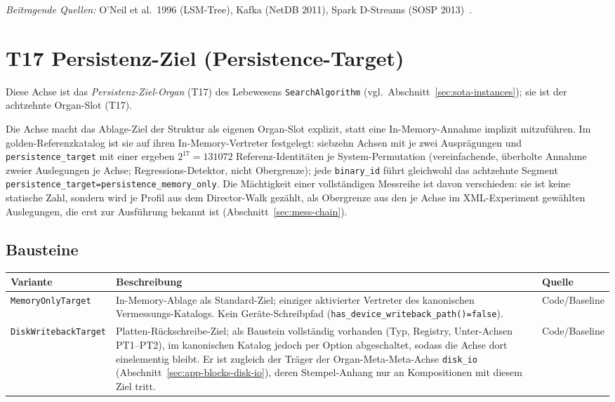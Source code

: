 \emph{Beitragende Quellen:} O'Neil et al.\ 1996 (LSM-Tree), Kafka (Net\allowbreak{}DB 2011), Spark D-Streams (SOSP 2013)~\cite{oneil1996lsm,kreps2011kafka,zaharia2013dstreams}.

\section{T17 Persistenz-Ziel (Persistence-Target)}

Diese Achse ist das \emph{Persistenz-Ziel-Organ} (T17) des Lebewesens \texttt{SearchAlgorithm} (vgl.\ Abschnitt~\ref{sec:sota-instances}); sie ist der achtzehnte Organ-Slot (T17).

Die Achse macht das Ablage-Ziel der Struktur als eigenen Organ-Slot explizit, statt eine In-Memory-Annahme implizit mitzuführen. Im golden-Referenzkatalog ist sie auf ihren In-Memory-Vertreter festgelegt: siebzehn Achsen mit je zwei Ausprägungen und \texttt{persistence\_\allowbreak{}target} mit einer ergeben $2^{17} = 131072$ Referenz-Identitäten je System-Permutation (vereinfachende, überholte Annahme zweier Auslegungen je Achse; Regressions-Detektor, nicht Obergrenze); jede \texttt{binary\_\allowbreak{}id} führt gleichwohl das achtzehnte Segment \texttt{persistence\_\allowbreak{}target=\allowbreak{}persistence\_\allowbreak{}memory\_\allowbreak{}only}. Die Mächtigkeit einer vollständigen Messreihe ist davon verschieden: sie ist keine statische Zahl, sondern wird je Profil aus dem Director-Walk gezählt, als Obergrenze aus den je Achse im XML-Experiment gewählten Auslegungen, die erst zur Ausführung bekannt ist (Abschnitt~\ref{sec:mess-chain}).

\subsection*{Bausteine}
\begin{scriptsize}
\begin{longtable}{@{}>{\raggedright\arraybackslash}p{3.0cm} >{\raggedright\arraybackslash}p{8.5cm} >{\raggedright\arraybackslash}p{2.0cm}@{}}
\toprule
Variante & Beschreibung & Quelle \\
\midrule
\endhead%
\texttt{Memory\allowbreak{}Only\allowbreak{}Target} & In-Memory-Ablage als Standard-Ziel; einziger aktivierter Vertreter des kanonischen Vermessungs-Katalogs. Kein Geräte-Schreibpfad (\texttt{has\_\allowbreak{}device\_\allowbreak{}writeback\_\allowbreak{}path()=false}). & Code/\allowbreak{}Baseline \\
\texttt{Disk\allowbreak{}Writeback\allowbreak{}Target} & Platten-Rückschreibe-Ziel; als Baustein vollständig vorhanden (Typ, Registry, Unter-Achsen PT1--PT2), im kanonischen Katalog jedoch per Option abgeschaltet, sodass die Achse dort einelementig bleibt. Er ist zugleich der Träger der Organ-Meta-Meta-Achse \texttt{disk\_\allowbreak{}io} (Abschnitt~\ref{sec:app-blocks-disk-io}), deren Stempel-Anhang nur an Kompositionen mit diesem Ziel tritt. & Code/\allowbreak{}Baseline \\
\bottomrule
\end{longtable}
\end{scriptsize}

